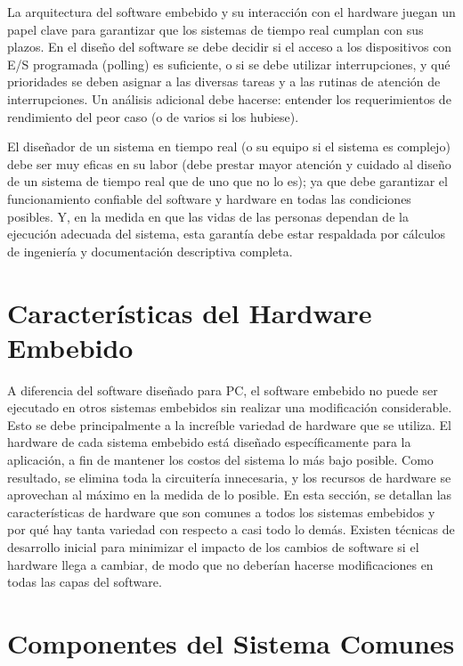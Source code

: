 \documentclass[output=paper, 
colorlinks,
citecolor=brown,
newtxmath
]{langscibook}
\begin{document}
La arquitectura del software embebido y su interacción con el hardware juegan 
un papel clave para garantizar que los sistemas de tiempo real cumplan con sus plazos. 
En el diseño del software se debe decidir si el acceso a los dispositivos con E/S programada
(polling) es suficiente, o si se debe utilizar interrupciones, y qué prioridades 
se deben asignar a las diversas tareas y a las rutinas de atención de interrupciones. 
Un análisis adicional debe hacerse: entender los requerimientos de rendimiento del peor caso
(o de varios si los hubiese).


El diseñador de un sistema en tiempo real (o su equipo si el sistema es complejo) debe ser
muy eficas en su labor (debe prestar mayor atención y cuidado al diseño de un sistema
de tiempo real que de uno que no lo es); 
ya que debe 
garantizar el funcionamiento confiable del software y hardware en todas 
las condiciones posibles. Y, en la medida en que las vidas de las personas dependan 
de la ejecución adecuada del sistema, esta garantía debe estar respaldada por 
cálculos de ingeniería y documentación descriptiva completa.




\section {Características del Hardware Embebido}




A diferencia del software diseñado para PC, el software embebido no puede ser ejecutado
en otros sistemas embebidos sin realizar una modificación considerable. Esto se debe 
principalmente a la increíble variedad de hardware que se utiliza.
El hardware de cada sistema embebido está diseñado específicamente para la aplicación, 
a fin de mantener los costos del sistema lo más bajo posible. Como resultado, 
se elimina toda la circuitería innecesaria, y los recursos de hardware se 
aprovechan al máximo en la medida de lo posible.
En esta sección, se detallan las características de hardware que son comunes 
a todos los sistemas embebidos y por qué hay tanta variedad con respecto a casi 
todo lo demás. Existen técnicas de desarrollo inicial para minimizar el impacto de 
los cambios de software si el hardware llega a cambiar, de modo que no deberían
hacerse modificaciones en todas las capas del software.



\section {Componentes del Sistema Comunes}
\end{document}
